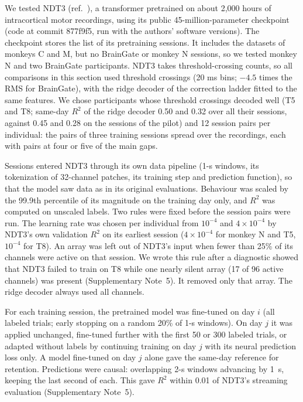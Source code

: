 \documentclass[pdflatex,sn-nature]{sn-jnl}
\begin{document}
We tested NDT3 (ref.~\cite{ye2025ndt3}), a transformer pretrained on about 2,000 hours of intracortical motor recordings, using
its public 45-million-parameter checkpoint (code at commit 877f9f5, run with the authors' software versions). The
checkpoint stores the list of its pretraining sessions. It includes the datasets of monkeys C and M, but no BrainGate or
monkey N sessions, so we tested monkey N and two BrainGate participants. NDT3 takes threshold-crossing counts, so all
comparisons in this section used threshold crossings (20 ms bins; $-4.5$ times the RMS for BrainGate), with the ridge
decoder of the correction ladder fitted to the same features. We chose participants whose threshold crossings decoded
well (T5 and T8; same-day $R^2$ of the ridge decoder 0.50 and 0.32 over all their sessions, against 0.45 and 0.28 on
the sessions of the pilot) and 12 session pairs per individual: the pairs of three
training sessions spread over the recordings, each with pairs at four or five of the main gaps.

Sessions entered NDT3 through its own data pipeline (1-s windows, its tokenization of 32-channel patches, its training
step and prediction function), so that the model saw data as in its original evaluations. Behaviour was scaled by the
99.9th percentile of its magnitude on the training day only, and $R^2$ was computed on unscaled labels. Two rules
were fixed before the session pairs were run. The learning rate was chosen per individual from $10^{-4}$ and
$4 \times 10^{-4}$ by NDT3's own validation $R^2$ on its earliest session ($4 \times 10^{-4}$ for monkey N and T5,
$10^{-4}$ for T8). An array was left out of NDT3's input when fewer than 25\% of its channels were active on that session.
We wrote this rule after a diagnostic showed that NDT3 failed to train on T8 while one nearly silent array (17 of 96
active channels) was present (Supplementary Note~5). It removed only that array. The ridge decoder always used all
channels.

For each training session, the pretrained model was fine-tuned on day $i$ (all labeled trials; early stopping on a random
20\% of 1-s windows). On day $j$ it was applied unchanged, fine-tuned further with the first 50 or 300 labeled trials, or
adapted without labels by continuing training on day $j$ with its neural prediction loss only. A model fine-tuned on
day $j$ alone gave the same-day reference for retention. Predictions were causal: overlapping 2-s windows advancing by
1~s, keeping the last second of each. This gave $R^2$ within 0.01 of NDT3's streaming evaluation (Supplementary Note~5).
\end{document}
